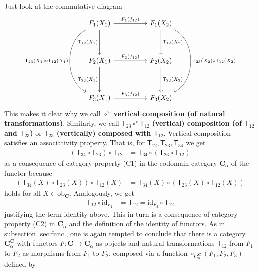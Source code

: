 Just look at the commutative diagram
\[
\begin{tikzcd}[sep=huge]
  F_{1}(X_{1})
  \arrow{r}{F_{1}(f_{12})}
  \arrow[swap]{d}{\mathsf{T}_{12}(X_{1})}
  \arrow[bend right=65,swap]{dd}{\mathsf{T}_{23}(X_{1}) \circ \mathsf{T}_{12}(X_{1})}
  &
  F_{1}(X_{2})
  \arrow{d}{\mathsf{T}_{12}(X_{2})}
  \arrow[bend left=65]{dd}{\mathsf{T}_{23}(X_{2}) \circ \mathsf{T}_{12}(X_{2})}
  \\
  F_{2}(X_{1})
  \arrow{r}{F_{2}(f_{12})}
  \arrow[swap]{d}{\mathsf{T}_{23}(X_{1})}
  &
  F_{2}(X_{2})
  \arrow{d}{\mathsf{T}_{23}(X_{2})}
  \\
  F_{3}(X_{1})
  \arrow{r}{F_{3}(f_{12})}
  &
  F_{3}(X_{2})
\end{tikzcd}
\]
This makes it clear why we call $\circ^{\textrm{v}}$ \textbf{vertical composition (of natural transformations)}.
Similarly, we call $\mathsf{T}_{23} \circ^{\textrm{v}} \mathsf{T}_{12}$ \textbf{(vertical) composition (of $\mathsf{T}_{12}$ and $\mathsf{T}_{23}$)} or \textbf{$\mathsf{T}_{23}$ (vertically) composed with $\mathsf{T}_{12}$}.
Vertical composition satisfies an associativity property.
That is, for $\mathsf{T}_{12},\mathsf{T}_{23},\mathsf{T}_{34}$ we get
\begin{align*}
  (\mathsf{T}_{34} \circ \mathsf{T}_{23})
  \circ
  \mathsf{T}_{12}
  &=
  \mathsf{T}_{34}
  \circ
  (\mathsf{T}_{23} \circ \mathsf{T}_{12})
\end{align*}
as a consequence of category property (C1) in the codomain category $\mathbf{C}_{\alpha}$ of the functor because
\begin{align*}
  (\mathsf{T}_{34}(X) \circ \mathsf{T}_{23}(X))
  \circ
  \mathsf{T}_{12}(X)
  &=
  \mathsf{T}_{34}(X)
  \circ
  (\mathsf{T}_{23}(X) \circ \mathsf{T}_{12}(X))
\end{align*}
holds for all $X \in \mathrm{ob}_{\mathbf{C}}$.
Analogously, we get
\begin{align*}
  \mathsf{T}_{12}
  \circ
  \mathrm{id}_{F_{1}}
  &=
  \mathsf{T}_{12}
  =
  \mathrm{id}_{F_{2}}
  \circ
  \mathsf{T}_{12}
\end{align*}
justifying the term identity above.
This in turn is a consequence of category property (C2) in $\mathbf{C}_{\alpha}$ and the definition of the identity of functors.
As in subsection \ref{sec:func}, one is again tempted to conclude that there is a category $\mathbf{C}_{\alpha}^{\mathbf{C}}$ with functors $F \colon \mathbf{C} \rightarrow \mathbf{C}_{\alpha}$ as objects and natural transformations $\mathsf{T}_{12}$ from $F_{1}$ to $F_{2}$ as morphisms from $F_{1}$ to $F_{2}$, composed via a function $\circ_{\mathbf{C}_{\alpha}^{\mathbf{C}}}(F_{1},F_{2},F_{3})$ defined by
